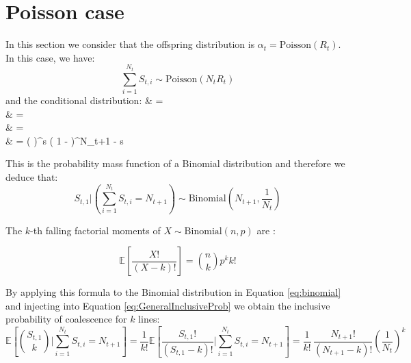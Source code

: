 \documentclass{article}
\let\oldalign\align
\let\oldendalign\endalign
\renewenvironment{align}{\linenomathNonumbers\oldalign}{\oldendalign\endlinenomath}
\renewcommand{\eqref}[1]{\ref{#1}}
\begin{document}
\section{Poisson case}

In this section we consider that the offspring distribution is $\alpha_t = \text{Poisson}(R_t)$.
In this case, we have: 
	\begin{equation}
		\sum_{i=1}^{N_t} S_{t,i} \sim \text{Poisson}(N_t R_t)
	\end{equation}
and the conditional distribution:
{\allowdisplaybreaks
	\begin{align}
		\bigg[S_{t,1} = s \bigg| \sum_{i=1}^{N_t} S_{t,i} = N_{t+1} \bigg]
			& =  \nonumber\\
			& =  \nonumber\\
			& =  \nonumber\\
			& =  \left(  \right)^s \left( 1 -  \right)^{N_{t+1} - s}
	\end{align}
}

This is the probability mass function of a Binomial distribution and therefore we deduce that:
	\begin{equation}
		S_{t,1} \bigg| \left(\sum_{i=1}^{N_t} S_{t,i} = N_{t+1}\right) \sim \text{Binomial}\left(N_{t+1}, \frac{1}{N_t}\right)\label{eq:binomial}
	\end{equation}

The $k$-th falling factorial moments of $X \sim \mathrm{Binomial}(n,p)$ are
\citep{Potts1953}:

\begin{equation}
	\mathbb{E}\left[\frac{X!}{(X-k)!}\right]=\binom{n}{k} p^k k!
\end{equation}

By applying this formula to the Binomial distribution in Equation \eqref{eq:binomial}
and injecting into Equation \eqref{eq:GeneralInclusiveProb} 
we obtain the inclusive probability of coalescence for $k$ lines:
\begin{equation}
	\mathbb{E} \left[ \binom{S_{t,1}}{k} \bigg| \sum_{i=1}^{N_t} S_{t,i} = N_{t+1} \right]
		= \frac{1}{k!} \mathbb{E} \left[ \frac{S_{t,1}!}{(S_{t,1} - k)!} \bigg| \sum_{i=1}^{N_t} S_{t,i} = N_{t+1} \right]
		= \frac{1}{k!} \, \frac{N_{t+1}!}{(N_{t+1} - k)!} \left( \frac{1}{N_t} \right)^k
\end{equation}
\end{document}
